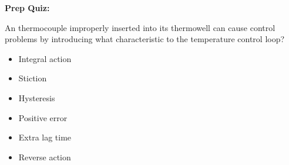 \vfil \eject

\noindent
{\bf Prep Quiz:}

An thermocouple improperly inserted into its thermowell can cause control problems by introducing what characteristic to the temperature control loop?

\begin{itemize}
\item{} Integral action
\vskip 10pt
\item{} Stiction
\vskip 10pt
\item{} Hysteresis
\vskip 10pt
\item{} Positive error
\vskip 10pt
\item{} Extra lag time
\vskip 10pt
\item{} Reverse action
\end{itemize}





